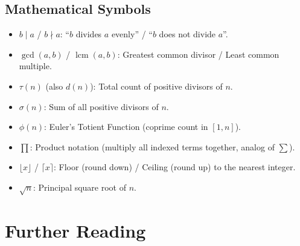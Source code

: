 \documentclass[11pt,a4paper]{article}
\theoremstyle{definition}
\begin{document}
\subsection*{Mathematical Symbols}
\begin{itemize}[itemsep=1.5pt, topsep=2pt]
    \item $b \mid a$ / $b \nmid a$: ``$b$ divides $a$ evenly'' / ``$b$ does not divide $a$''.
    \item $\gcd(a, b)$ / $\operatorname{lcm}(a, b)$: Greatest common divisor / Least common multiple.
    \item $\tau(n)$ (also $d(n)$): Total count of positive divisors of $n$.
    \item $\sigma(n)$: Sum of all positive divisors of $n$.
    \item $\phi(n)$: Euler's Totient Function (coprime count in $[1, n]$).
    \item $\prod$: Product notation (multiply all indexed terms together, analog of $\sum$).
    \item $\lfloor x \rfloor$ / $\lceil x \rceil$: Floor (round down) / Ceiling (round up) to the nearest integer.
    \item $\sqrt{n}$: Principal square root of $n$.
\end{itemize}

\section{Further Reading}
\end{document}
